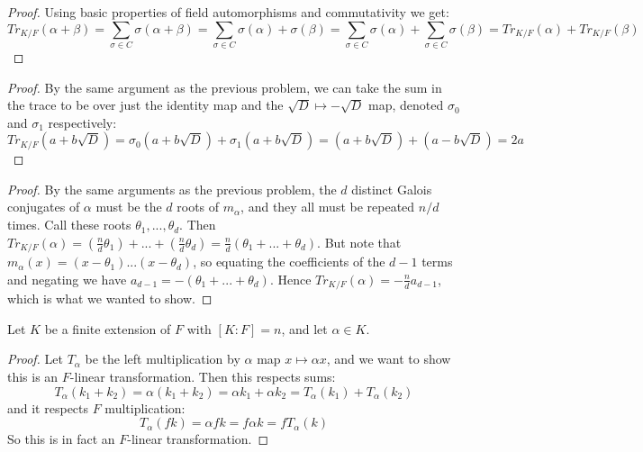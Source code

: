\documentclass[11pt]{article}
\begin{document}
\begin{proof}
  Using basic properties of field automorphisms and commutativity we get:
  \begin{equation*}
    Tr_{K/F}(\alpha + \beta)
    = \sum_{\sigma \in C} \sigma(\alpha + \beta)
    = \sum_{\sigma \in C} \sigma(\alpha) + \sigma(\beta)
    = \sum_{\sigma \in C} \sigma(\alpha) + \sum_{\sigma \in C} \sigma(\beta)
    = Tr_{K/F}(\alpha) + Tr_{K/F}(\beta)
  \end{equation*}
\end{proof}

\begin{proof}
  By the same argument as the previous problem, we can take the sum in the trace to be over just the identity map and the $\sqrt{D} \mapsto -\sqrt{D}$ map, denoted $\sigma_0$ and $\sigma_1$ respectively:
  \begin{equation*}
    Tr_{K/F}(a + b\sqrt{D})
    = \sigma_0(a + b\sqrt{D}) +  \sigma_1(a + b\sqrt{D})
    = (a + b\sqrt{D}) + (a - b\sqrt{D})
    = 2a
  \end{equation*}
\end{proof}

\begin{proof}
  By the same arguments as the previous problem, the $d$ distinct Galois conjugates of $\alpha$ must be the $d$ roots of $m_\alpha$, and they all must be repeated $n/d$ times.
  Call these roots $\theta_1,...,\theta_d$.
  Then $Tr_{K/F}(\alpha) = (\frac{n}{d}\theta_1)+...+(\frac{n}{d}\theta_d) = \frac{n}{d}(\theta_1+...+\theta_d)$.
  But note that $m_\alpha(x) = (x-\theta_1)...(x-\theta_d)$, so equating the coefficients of the $d-1$ terms and negating we have $a_{d-1} = -(\theta_1+...+\theta_d)$.
  Hence $Tr_{K/F}(\alpha) = -\frac{n}{d}a_{d-1}$, which is what we wanted to show. 
\end{proof}


Let $K$ be a finite extension of $F$ with $[K:F] = n$, and let $\alpha \in K$.

\begin{proof}
  Let $T_\alpha$ be the left multiplication by $\alpha$ map $x \mapsto \alpha x$, and we want to show this is an $F$-linear transformation.
  Then this respects sums:
  \begin{equation*}
    T_\alpha(k_1 + k_2)
    = \alpha(k_1 + k_2)
    = \alpha k_1 + \alpha k_2
    = T_\alpha(k_1) + T_\alpha(k_2)
  \end{equation*}
  and it respects $F$ multiplication:
  \begin{equation*}
    T_\alpha(f k)
    = \alpha f k
    = f \alpha k
    = f T_\alpha(k)
  \end{equation*}
  So this is in fact an $F$-linear transformation.
\end{proof}
\end{document}
